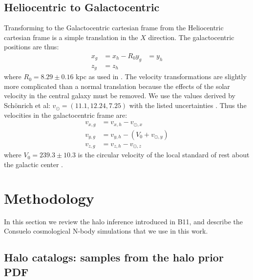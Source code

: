 \documentclass[iop,apj]{emulateapj}
\newcommand{\consuelo}{{\sc Consuelo }}
\begin{document}
\subsection{Heliocentric to Galactocentric}
\label{sec:hel_to_gal}
Transforming to the Galactocentric cartesian frame from the Heliocentric cartesian frame is a simple translation in the $X$ direction. The galactocentric positions are thus:
\begin{equation}
\begin{aligned}
x_{g} &= x_{h} - R_{0}
y_{g} &= y_{h} \\
z_{g} &= z_{h}
\end{aligned}
\end{equation}
where $R_{0} = 8.29 \pm 0.16$ kpc as used in \cite{vdm12m31}. The velocity transformations are slightly more complicated than a normal translation because the effects of the solar velocity in the central galaxy must be removed. We use the values derived by Schönrich et al: $v_{\odot} = (11.1, 12.24, 7.25)$ with the listed uncertainties \citep{sunlsr}. Thus the velocities in the galactocentric frame are:
\begin{equation}
\begin{aligned}
v_{x,g} &= v_{x,h} - v_{\odot,x} \\
v_{y,g} &= v_{y,h} - (V_{0}+v_{\odot,y})\\
v_{z,g} &= v_{z,h} - v_{\odot,z}
\end{aligned}
\end{equation}
where $V_{0} = 239.3 \pm 10.3$ is the circular velocity of the local standard of rest about the galactic center \citep{vdm12m31}.

\section{Methodology}
\label{sec:method}

In this section we review the halo inference introduced in B11, and describe
the \consuelo cosmological N-body simulations that we use in this work.


\subsection{Halo catalogs: samples from the halo prior PDF}
\label{sec:sampling}
\end{document}
